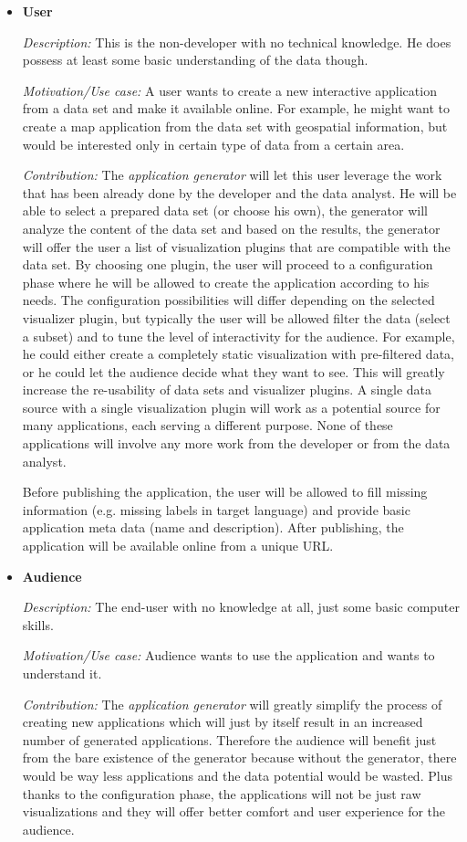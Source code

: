 \begin{itemize}
\item \textbf{User}

\textit{Description: }This is the non-developer with no technical knowledge. He does possess at least some basic understanding of the data though.

\textit{Motivation/Use case: }A user wants to create a new interactive application from a data set and make it available online. For example, he might want to create a map application from the data set with geospatial information, but would be interested only in certain type of data from a certain area.

\textit{Contribution: }The \emph{application generator} will let this user leverage the work that has been already done by the developer and the data analyst. He will be able to select a prepared data set (or choose his own), the generator will analyze the content of the data set and based on the results, the generator will offer the user a list of visualization plugins that are compatible with the data set. By choosing one plugin, the user will proceed to a configuration phase where he will be allowed to create the application according to his needs. The configuration possibilities will differ depending on the selected visualizer plugin, but typically the user will be allowed filter the data (select a subset) and to tune the level of interactivity for the audience. For example, he could either create a completely static visualization with pre-filtered data, or he could let the audience decide what they want to see. This will greatly increase the re-usability of data sets and visualizer plugins. A single data source with a single visualization plugin will work as a potential source for many applications, each serving a different purpose. None of these applications will involve any more work from the developer or from the data analyst.

Before publishing the application, the user will be allowed to fill missing information (e.g. missing labels in target language) and provide basic application meta data (name and description). After publishing, the application will be available online from a unique URL.

\item \textbf{Audience}

\textit{Description:} The end-user with no knowledge at all, just some basic computer skills.

\textit{Motivation/Use case:} Audience wants to use the application and wants to understand it.

\textit{Contribution:} The \emph{application generator} will greatly simplify the process of creating new applications which will just by itself result in an increased number of generated applications. Therefore the audience will benefit just from the bare existence of the generator because without the generator, there would be way less applications and the data potential would be wasted. Plus thanks to the configuration phase, the applications will not be just raw visualizations and they will offer better comfort and user experience for the audience.

\end{itemize}

